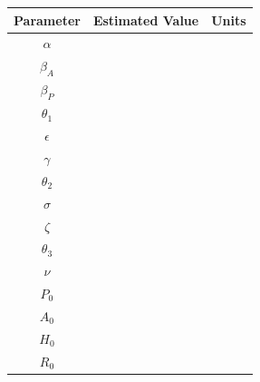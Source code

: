 \documentclass[12pt]{article}
\begin{document}
\begin{center}

\begin{tabular}{|c | c | c|}

 \hline

{Parameter} & {Estimated Value} & {Units} \\ [0.5ex]

 \hline\hline

$\alpha$ &  &  \\

 \hline

$\beta_A$ &  &  \\

\hline

$\beta_P$ &  &  \\

\hline

$\theta_1$&  &  \\

\hline

$\epsilon$ &  &  \\

\hline

$\gamma$ &  &  \\

\hline

$\theta_2$ &  &  \\

\hline

$\sigma$ &  &  \\

\hline

$\zeta$ &  &  \\

\hline

$\theta_3$ &  &  \\

\hline

$\nu$ &  &  \\

\hline

$P_0$ &  &  \\

\hline

$A_0$ &  &  \\

\hline

$H_0$ &  &  \\

\hline

$R_0$ &  &  \\


 \hline

\end{tabular}

\end{center}
 
\end{document}
